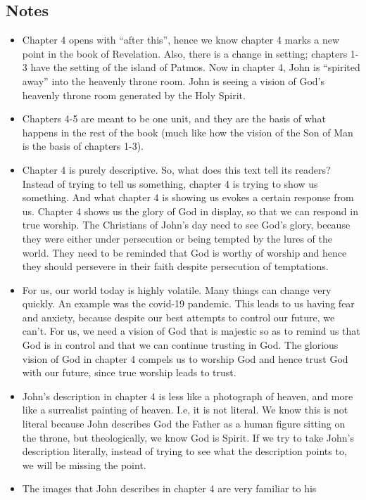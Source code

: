 \subsection*{Notes}
\begin{itemize}
  \item{Chapter 4 opens with ``after this'', hence we know chapter 4 marks a
  new point in the book of Revelation.  Also, there is a change in setting;
  chapters 1-3 have the setting of the island of Patmos.  Now in chapter 4,
  John is ``spirited away'' into the heavenly throne room. John is seeing a vision of God's heavenly throne room generated by the Holy Spirit. }
  \item{Chapters 4-5 are meant to be one unit, and they are the basis of what
  happens in the rest of the book (much like how the vision of the Son of Man
  is the basis of chapters 1-3).}
  \item{Chapter 4 is purely descriptive.  So, what does this text tell its
  readers?  Instead of trying to tell us something, chapter 4 is trying to
  show us something.  And what chapter 4 is showing us evokes a certain
  response from us.  Chapter 4 shows us the glory of God in display, so that
  we can respond in true worship.  The Christians of John's day need to see
  God's glory, because they were either under persecution or being tempted by
  the lures of the world.  They need to be reminded that God is worthy of
  worship and hence they should persevere in their faith despite persecution
  of temptations.}
  \item{For us, our world today is highly volatile.  Many things can change
  very quickly.  An example was the covid-19 pandemic.  This leads to us
  having fear and anxiety, because despite our best attempts to control our
  future, we can't.  For us, we need a vision of God that is majestic so as
  to remind us that God is in control and that we can continue trusting in
  God.  The glorious vision of God in chapter 4 compels us to worship God and
  hence trust God with our future, since true worship leads to trust.}
  \item{John's description in chapter 4 is less like a photograph of heaven,
  and more like a surrealist painting of heaven.  I.e, it is not literal.  We
  know this is not literal because John describes God the Father as a human
  figure sitting on the throne, but theologically, we know God is Spirit. If we try to take John's description literally, instead of trying to see what the description points to, we will be missing the point.}
  \item{The images that John describes in chapter 4 are very familiar to his
}
\end{itemize}
